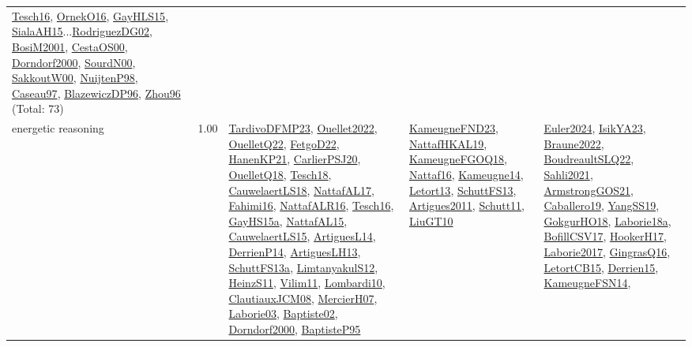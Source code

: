 {\begin{longtable}{p{3cm}r>{\raggedright\arraybackslash}p{6cm}>{\raggedright\arraybackslash}p{6cm}>{\raggedright\arraybackslash}p{8cm}}
\hyperref[detail:Tesch16]{Tesch16}, \hyperref[detail:OrnekO16]{OrnekO16}, \hyperref[detail:GayHLS15]{GayHLS15}, \hyperref[detail:SialaAH15]{SialaAH15}...\hyperref[detail:RodriguezDG02]{RodriguezDG02}, \hyperref[detail:BosiM2001]{BosiM2001}, \hyperref[detail:CestaOS00]{CestaOS00}, \hyperref[detail:Dorndorf2000]{Dorndorf2000}, \hyperref[detail:SourdN00]{SourdN00}, \hyperref[detail:SakkoutW00]{SakkoutW00}, \hyperref[detail:NuijtenP98]{NuijtenP98}, \hyperref[detail:Caseau97]{Caseau97}, \hyperref[detail:BlazewiczDP96]{BlazewiczDP96}, \hyperref[detail:Zhou96]{Zhou96} (Total: 73)\\
\index{energetic reasoning}\index{Algorithms!energetic reasoning}energetic reasoning &  1.00 & \hyperref[detail:TardivoDFMP23]{TardivoDFMP23}, \hyperref[detail:Ouellet2022]{Ouellet2022}, \hyperref[detail:OuelletQ22]{OuelletQ22}, \hyperref[detail:FetgoD22]{FetgoD22}, \hyperref[detail:HanenKP21]{HanenKP21}, \hyperref[detail:CarlierPSJ20]{CarlierPSJ20}, \hyperref[detail:OuelletQ18]{OuelletQ18}, \hyperref[detail:Tesch18]{Tesch18}, \hyperref[detail:CauwelaertLS18]{CauwelaertLS18}, \hyperref[detail:NattafAL17]{NattafAL17}, \hyperref[detail:Fahimi16]{Fahimi16}, \hyperref[detail:NattafALR16]{NattafALR16}, \hyperref[detail:Tesch16]{Tesch16}, \hyperref[detail:GayHS15a]{GayHS15a}, \hyperref[detail:NattafAL15]{NattafAL15}, \hyperref[detail:CauwelaertLS15]{CauwelaertLS15}, \hyperref[detail:ArtiguesL14]{ArtiguesL14}, \hyperref[detail:DerrienP14]{DerrienP14}, \hyperref[detail:ArtiguesLH13]{ArtiguesLH13}, \hyperref[detail:SchuttFS13a]{SchuttFS13a}, \hyperref[detail:LimtanyakulS12]{LimtanyakulS12}, \hyperref[detail:HeinzS11]{HeinzS11}, \hyperref[detail:Vilim11]{Vilim11}, \hyperref[detail:Lombardi10]{Lombardi10}, \hyperref[detail:ClautiauxJCM08]{ClautiauxJCM08}, \hyperref[detail:MercierH07]{MercierH07}, \hyperref[detail:Laborie03]{Laborie03}, \hyperref[detail:Baptiste02]{Baptiste02}, \hyperref[detail:Dorndorf2000]{Dorndorf2000}, \hyperref[detail:BaptisteP95]{BaptisteP95} & \hyperref[detail:KameugneFND23]{KameugneFND23}, \hyperref[detail:NattafHKAL19]{NattafHKAL19}, \hyperref[detail:KameugneFGOQ18]{KameugneFGOQ18}, \hyperref[detail:Nattaf16]{Nattaf16}, \hyperref[detail:Kameugne14]{Kameugne14}, \hyperref[detail:Letort13]{Letort13}, \hyperref[detail:SchuttFS13]{SchuttFS13}, \hyperref[detail:Artigues2011]{Artigues2011}, \hyperref[detail:Schutt11]{Schutt11}, \hyperref[detail:LiuGT10]{LiuGT10} & \hyperref[detail:Euler2024]{Euler2024}, \hyperref[detail:IsikYA23]{IsikYA23}, \hyperref[detail:Braune2022]{Braune2022}, \hyperref[detail:BoudreaultSLQ22]{BoudreaultSLQ22}, \hyperref[detail:Sahli2021]{Sahli2021}, \hyperref[detail:ArmstrongGOS21]{ArmstrongGOS21}, \hyperref[detail:Caballero19]{Caballero19}, \hyperref[detail:YangSS19]{YangSS19}, \hyperref[detail:GokgurHO18]{GokgurHO18}, \hyperref[detail:Laborie18a]{Laborie18a}, \hyperref[detail:BofillCSV17]{BofillCSV17}, \hyperref[detail:HookerH17]{HookerH17}, \hyperref[detail:Laborie2017]{Laborie2017}, \hyperref[detail:GingrasQ16]{GingrasQ16}, \hyperref[detail:LetortCB15]{LetortCB15}, \hyperref[detail:Derrien15]{Derrien15}, \hyperref[detail:KameugneFSN14]{KameugneFSN14}, 
\end{longtable}}
